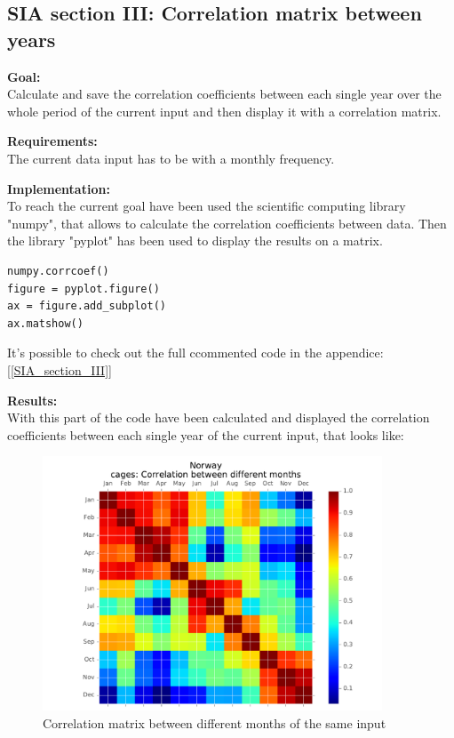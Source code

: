 \newpage
\subsection{SIA section III: Correlation matrix between years}

\textbf{Goal:}\\
Calculate and save the correlation coefficients between each single year over the whole period of the current input and then display it with a correlation matrix.

\textbf{Requirements:}\\
The current data input has to be with a monthly frequency. 

\textbf{Implementation:}\\
To reach the current goal have been used the scientific computing library "numpy", that allows to calculate the correlation coefficients between data. Then the library "pyplot" has been used to display the results on a matrix.
\begin{lstlisting}
numpy.corrcoef()
figure = pyplot.figure()
ax = figure.add_subplot()
ax.matshow()
\end{lstlisting}

It's possible to check out the full ccommented code in the appendice: [\ref{SIA_section_III}]

\textbf{Results:} \\
With this part of the code have been calculated and displayed the correlation coefficients between each single year of the current input, that looks like:

\begin{figure}[H]
	\centering
    \includegraphics[width=0.9\textwidth]{Files/Cages_Months_Matrix.pdf}
    \caption{Correlation matrix between different months of the same input}
\end{figure}




